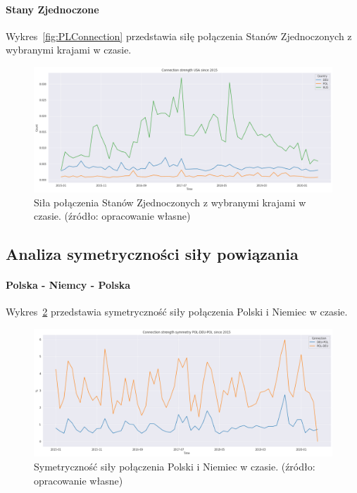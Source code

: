 \documentclass[11pt]{report}
\begin{document}
    \paragraph{Stany Zjednoczone}

    Wykres~\ref{fig:PLConnection} przedstawia siłę połączenia Stanów Zjednoczonych z wybranymi krajami w czasie.

    \begin{figure}[!htp]
        \centering
        \includegraphics[width=\linewidth]{fig/USA/USAConnection.png}
        \caption{Siła połączenia Stanów Zjednoczonych z wybranymi krajami w czasie. (źródło: opracowanie własne)}
        \label{fig:USAConnection}
    \end{figure}

    \subsection{Analiza symetryczności siły powiązania}

    \paragraph{Polska - Niemcy - Polska}

    Wykres~\ref{fig:POL-DEU-POL} przedstawia symetryczność siły połączenia Polski i Niemiec w czasie.


    \begin{figure}[!htp]
        \centering
        \includegraphics[width=\linewidth]{fig/ConnectionSymmetry/POL-DEU-POL.png}
        \caption{Symetryczność siły połączenia Polski i Niemiec w czasie. (źródło: opracowanie własne)}
        \label{fig:POL-DEU-POL}
    \end{figure}
\end{document}
